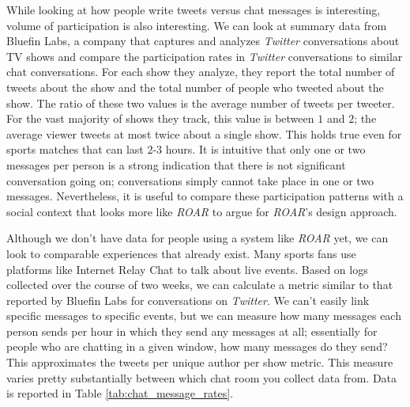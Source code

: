 While looking at how people write tweets versus chat messages is interesting, volume of participation is also interesting. We can look at summary data from Bluefin Labs, a company that captures and analyzes \emph{Twitter} conversations about TV shows and compare the participation rates in \emph{Twitter} conversations to similar chat conversations. For each show they analyze, they report the total number of tweets about the show and the total number of people who tweeted about the show. The ratio of these two values is the average number of tweets per tweeter. For the vast majority of shows they track, this value is between $1$ and $2$; the average viewer tweets at most twice about a single show. This holds true even for sports matches that can last 2-3 hours. It is intuitive that only one or two messages per person is a strong indication that there is not significant conversation going on; conversations simply cannot take place in one or two messages. Nevertheless, it is useful to compare these participation patterns with a social context that looks more like \emph{ROAR} to argue for \emph{ROAR}'s design approach.


Although we don't have data for people using a system like \emph{ROAR} yet, we can look to comparable experiences that already exist. Many sports fans use platforms like Internet Relay Chat to talk about live events. Based on logs collected over the course of two weeks, we can calculate a metric similar to that reported by Bluefin Labs for conversations on \emph{Twitter}. We can't easily link specific messages to specific events, but we can measure how many messages each person sends per hour in which they send any messages at all; essentially for people who are chatting in a given window, how many messages do they send? This approximates the tweets per unique author per show metric. This measure varies pretty substantially between which chat room you collect data from. Data is reported in Table \ref{tab:chat_message_rates}. 



